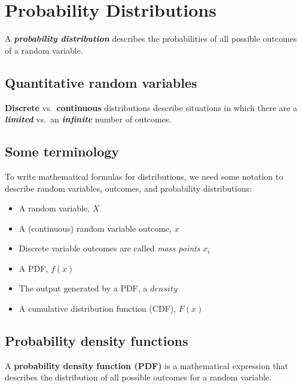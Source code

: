 \documentclass[
]{article}
\providecommand{\tightlist}{%
  \setlength{\itemsep}{0pt}\setlength{\parskip}{0pt}}
\begin{document}
\hypertarget{probability-distributions}{%
\section{Probability Distributions}\label{probability-distributions}}

A \textbf{\emph{probability distribution}} describes the probabilities
of all possible outcomes of a random variable.

\hypertarget{quantitative-random-variables}{%
\subsection{Quantitative random
variables}\label{quantitative-random-variables}}

\textbf{Discrete} vs.~\textbf{continuous} distributions describe
situations in which there are a \textbf{\emph{limited}} vs.~an
\textbf{\emph{infinite}} number of outcomes.

\hypertarget{some-terminology}{%
\subsection{Some terminology}\label{some-terminology}}

To write mathematical formulas for distributions, we need some notation
to describe random variables, outcomes, and probability distributions:

\begin{itemize}
\tightlist
\item
  A random variable, \(X\)
\item
  A (continuous) random variable outcome, \(x\)
\item
  Discrete variable outcomes are called \emph{mass points} \(x_i\)
\item
  A PDF, \(f(x)\)
\item
  The output generated by a PDF, a \(density\)
\item
  A cumulative distribution function (CDF), \(F(x)\)
\end{itemize}

\hypertarget{probability-density-functions}{%
\subsection{Probability density
functions}\label{probability-density-functions}}

A \textbf{probability density function (PDF)} is a mathematical
expression that describes the distribution of all possible outcomes for
a random variable.
\end{document}
